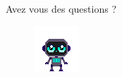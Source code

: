 \documentclass{beamer}
\begin{document}
\begin{frame}
    \centering
    Avez vous des questions ?
    \begin{figure}
        \centering
        \includegraphics[width=0.5\linewidth]{images/character_placeholder.png}
    \end{figure}
\end{frame}
\end{document}
